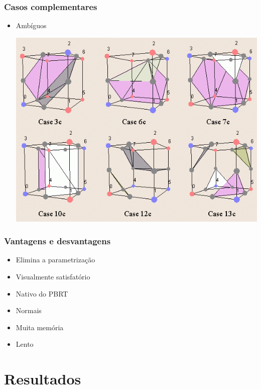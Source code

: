 \documentclass[brazil]{beamer}
\begin{document}
    \begin{frame}
      \frametitle{Casos complementares}
        \begin{itemize}
          \item Ambíguos
            \begin{center}
              \includegraphics[width=.6\textwidth]{imgs/ambiguous-cases.png}
            \end{center}
        \end{itemize}
    \end{frame}        

    \begin{frame}
      \frametitle{Vantagens e desvantagens}
        \begin{itemize}
          \item Elimina a parametrização
          \item Visualmente satisfatório
          \item Nativo do PBRT
          \item Normais
          \item Muita memória
          \item Lento
        \end{itemize}
    \end{frame}        

  \section{Resultados}
  
    \subsection{}
    
\end{document}
